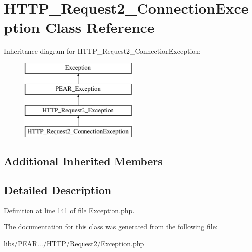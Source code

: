 \hypertarget{classHTTP__Request2__ConnectionException}{\section{H\-T\-T\-P\-\_\-\-Request2\-\_\-\-Connection\-Exception Class Reference}
\label{classHTTP__Request2__ConnectionException}
}
Inheritance diagram for H\-T\-T\-P\-\_\-\-Request2\-\_\-\-Connection\-Exception\-:\begin{figure}[H]
\begin{center}
\leavevmode
\includegraphics[height=4.000000cm]{classHTTP__Request2__ConnectionException}
\end{center}
\end{figure}
\subsection*{Additional Inherited Members}


\subsection{Detailed Description}


Definition at line 141 of file Exception.\-php.



The documentation for this class was generated from the following file\-:\begin{DoxyCompactItemize}
\item 
libs/\-P\-E\-A\-R.../\-H\-T\-T\-P/\-Request2/\hyperlink{HTTP_2Request2_2Exception_8php}{Exception.\-php}\end{DoxyCompactItemize}
